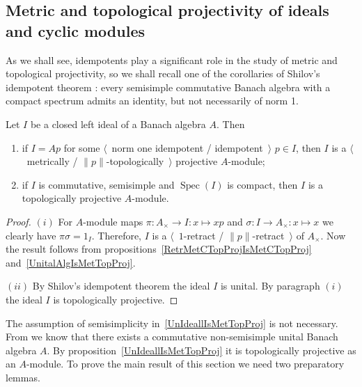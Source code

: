 
\subsection{
    Metric and topological projectivity of ideals and cyclic modules}
\label{SubSectionMetricAndTopologicalProjectivityOfIdealsAndCyclicModules}

As we shall see, idempotents play a significant role in the study of metric and
topological projectivity, so we shall recall one of the corollaries of Shilov's
idempotent theorem \cite[section 3.5]{KaniBanAlg}: every semisimple
commutative Banach algebra with a compact spectrum admits an identity, but not
necessarily of norm 1. 

\begin{proposition}\label{UnIdeallIsMetTopProj} Let $I$ be a closed left ideal of a
Banach algebra $A$. Then

\begin{enumerate}[label = (\roman*)]
    \item if $I=Ap$ for some $\langle$~norm one idempotent /
    idempotent~$\rangle$ $p\in I$, then $I$ is a $\langle$~metrically / 
    $\lVert p\rVert$-topologically~$\rangle$ projective $A$-module;

    \item if $I$ is commutative, semisimple and $\operatorname{Spec}(I)$ is
    compact, then $I$ is a topologically projective $A$-module.
\end{enumerate}
\end{proposition}
\begin{proof} 
$(i)$ For $A$-module maps $\pi:A_\times\to I:x\mapsto xp$ and 
$\sigma:I\to A_\times:x\mapsto x$ we clearly have $\pi\sigma=1_I$. 
Therefore, $I$ is a $\langle$~$1$-retract / $\lVert p\rVert$-retract~$\rangle$ 
of $A_\times$. Now the result follows from 
propositions~\ref{RetrMetCTopProjIsMetCTopProj} and~\ref{UnitalAlgIsMetTopProj}.

$(ii)$ By Shilov's idempotent theorem the ideal $I$ is unital. 
By paragraph $(i)$ the ideal $I$ is topologically projective.
\end{proof}

The assumption of semisimplicity in~\ref{UnIdeallIsMetTopProj} is not necessary.
From \cite[exercise 2.3.7]{DalesIntroBanAlgOpHarmAnal} we know that there
exists a commutative non-semisimple unital Banach algebra $A$. By
proposition~\ref{UnIdeallIsMetTopProj} it is topologically projective as
an $A$-module. To prove the main result of this section we need two preparatory
lemmas.


